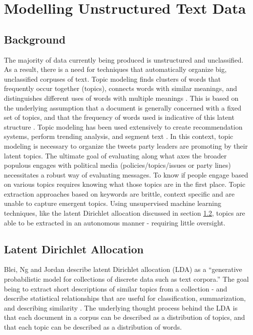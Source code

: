 \chapter{Modelling Unstructured Text Data}\label{ch:TopicModelling}

\section{Background}

The majority of data currently being produced is unstructured and unclassified.
As a result, there is a need for techniques that automatically organize big,
unclassified corpuses of text. Topic modeling finds clusters of words that
frequently occur together (topics), connects words with similar meanings, and
distinguishes different uses of words with multiple meanings
\cite{alghamdi2015survey}. This is based on the underlying assumption that a
document is generally concerned with a fixed set of topics, and that the
frequency of words used is indicative of this latent structure
\cite{blei2003latent}. Topic modeling has been used extensively to create
recommendation systems, perform trending analysis, and segment text
\cite{alghamdi2015survey}. In this context, topic modeling is
necessary to organize the tweets party leaders are promoting by their latent
topics. The ultimate goal of evaluating along what axes the broader populous
engages with political media (policies/topics/issues or party lines)
necessitates a robust way of evaluating messages. To know if people engage based
on various topics requires knowing what those topics are in the first place.
Topic extraction approaches based on keywords are brittle, context specific and
are unable to capture emergent topics. Using unsupervised machine learning
techniques, like the latent Dirichlet allocation discussed in section
\ref{sec:LDA}, topics are able to be extracted in an autonomous manner -
requiring little oversight.

\section{Latent Dirichlet Allocation}\label{sec:LDA}

Blei, Ng and Jordan describe latent Dirichlet allocation (LDA) as a “generative
probabilistic model for collections of discrete data such as text corpora.” The
goal being to extract short descriptions of similar topics from a collection -
and describe statistical relationships that are useful for classification,
summarization, and describing similarity \cite{blei2003latent}. The underlying
thought process behind the LDA is that each document in a corpus can be
described as a distribution of topics, and that each topic can be described as a
distribution of words. 

